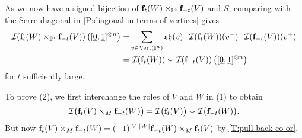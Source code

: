 As we now have a signed bijection of $\mathbf{f}_t(W) \times_{\mathbb{I}^n} \mathbf{f}_{-t}(V)$ and $S$, comparing with the Serre diagonal in \cref{P:diagonal in terms of vertices} gives
\begin{align*}
	\mathcal{I} (\mathbf{f}_t(W) \times_{\mathbb{I}^n} \mathbf{f}_{-t}(V)) \left([\underline{0}, \underline{1}]^{\otimes n}\right) = &
	\sum_{v \in {\rm Vert}(\mathbb{I}^n)} \mathfrak{sh}(v) \cdot \mathcal{I}(\mathbf{f}_t(W))(v^-) \cdot \mathcal{I}(\mathbf{f}_{-t}(V))(v^+) \\ = & \
	\mathcal{I}(\mathbf{f}_t(W)) \smallsmile \mathcal{I}(\mathbf{f}_{-t}(V)) \left([\underline{0}, \underline{1}]^{\otimes n}\right)
\end{align*}
for $t$ sufficiently large.

To prove (2), we first interchange the roles of $V$ and $W$ in (1) to obtain
\[
\mathcal{I} \big( \mathbf{f}_t(V) \times_M \mathbf{f}_{-t}(W) \big) =
\mathcal{I} \big( \mathbf{f}_t(V) \big) \smallsmile \mathcal{I} \big( \mathbf{f}_{-t}(W) \big).
\]
But now $\mathbf{f}_t(V) \times_M \mathbf{f}_{-t}(W)=(-1)^{|V||W|}\mathbf{f}_{-t}(W) \times_M \mathbf{f}_{t}(V)$ by \cref{T:pull-back co-or}.
\hfill\qedsymbol